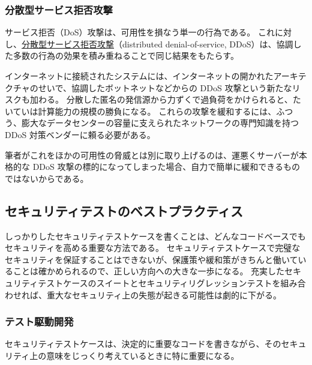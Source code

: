 \documentclass[uplatex]{jsarticle}
\def\label#1{}%
\begin{document}

\subsubsection{分散型サービス拒否攻撃}

\begin{dfn}[分散型サービス拒否攻撃]\label{dfn:ch12-ddos}
サービス拒否（DoS）攻撃は、可用性を損なう単一の行為である。
これに対し、\underline{分散型サービス拒否攻撃}（distributed denial-of-service, DDoS）は、協調した多数の行為の効果を積み重ねることで同じ結果をもたらす。
\end{dfn}

インターネットに接続されたシステムには、インターネットの開かれたアーキテクチャのせいで、協調したボットネットなどからの DDoS 攻撃という新たなリスクも加わる。
分散した匿名の発信源から力ずくで過負荷をかけられると、たいていは計算能力の規模の勝負になる。
これらの攻撃を緩和するには、ふつう、膨大なデータセンターの容量に支えられたネットワークの専門知識を持つ DDoS 対策ベンダーに頼る必要がある。

筆者がこれをほかの可用性の脅威とは別に取り上げるのは、運悪くサーバーが本格的な DDoS 攻撃の標的になってしまった場合、自力で簡単に緩和できるものではないからである。

\subsection{セキュリティテストのベストプラクティス}

しっかりしたセキュリティテストケースを書くことは、どんなコードベースでもセキュリティを高める重要な方法である。
セキュリティテストケースで完璧なセキュリティを保証することはできないが、保護策や緩和策がきちんと働いていることは確かめられるので、正しい方向への大きな一歩になる。
充実したセキュリティテストケースのスイートとセキュリティリグレッションテストを組み合わせれば、重大なセキュリティ上の失態が起きる可能性は劇的に下がる。

\subsubsection{テスト駆動開発}

セキュリティテストケースは、決定的に重要なコードを書きながら、そのセキュリティ上の意味をじっくり考えているときに特に重要になる。
\end{document}
